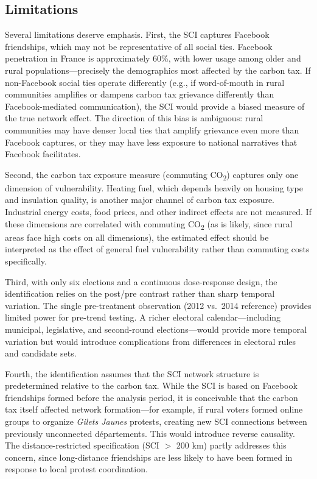 \documentclass[12pt]{article}
\newcommand{\gj}{\textit{Gilets Jaunes}}
\newcommand{\depts}{d\'{e}partements}
\begin{document}
\subsection{Limitations}

Several limitations deserve emphasis. First, the SCI captures Facebook friendships, which may not be representative of all social ties. Facebook penetration in France is approximately 60\%, with lower usage among older and rural populations---precisely the demographics most affected by the carbon tax. If non-Facebook social ties operate differently (e.g., if word-of-mouth in rural communities amplifies or dampens carbon tax grievance differently than Facebook-mediated communication), the SCI would provide a biased measure of the true network effect. The direction of this bias is ambiguous: rural communities may have denser local ties that amplify grievance even more than Facebook captures, or they may have less exposure to national narratives that Facebook facilitates.

Second, the carbon tax exposure measure (commuting CO\textsubscript{2}) captures only one dimension of vulnerability. Heating fuel, which depends heavily on housing type and insulation quality, is another major channel of carbon tax exposure. Industrial energy costs, food prices, and other indirect effects are not measured. If these dimensions are correlated with commuting CO\textsubscript{2} (as is likely, since rural areas face high costs on all dimensions), the estimated effect should be interpreted as the effect of general fuel vulnerability rather than commuting costs specifically.

Third, with only six elections and a continuous dose-response design, the identification relies on the post/pre contrast rather than sharp temporal variation. The single pre-treatment observation (2012 vs.\ 2014 reference) provides limited power for pre-trend testing. A richer electoral calendar---including municipal, legislative, and second-round elections---would provide more temporal variation but would introduce complications from differences in electoral rules and candidate sets.

Fourth, the identification assumes that the SCI network structure is predetermined relative to the carbon tax. While the SCI is based on Facebook friendships formed before the analysis period, it is conceivable that the carbon tax itself affected network formation---for example, if rural voters formed online groups to organize \gj{} protests, creating new SCI connections between previously unconnected \depts{}. This would introduce reverse causality. The distance-restricted specification (SCI $>$ 200 km) partly addresses this concern, since long-distance friendships are less likely to have been formed in response to local protest coordination.
\end{document}
